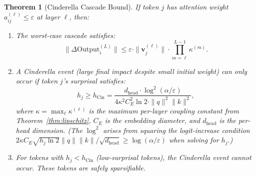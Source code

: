 \documentclass[11pt]{article}
\newtheorem{theorem}{Theorem}
\begin{document}
\begin{theorem}[Cinderella Cascade Bound]
\label{thm:cinderella}
If token $j$ has attention weight $a^{(\ell)}_{ij} \leq \varepsilon$ at layer
$\ell$, then:
\begin{enumerate}[leftmargin=2em,label=(\alph*)]
  \item The \emph{worst-case} cascade satisfies:
  \[
    \|\Delta \mathrm{Output}^{(L)}_i\|
    \leq \varepsilon \cdot \|\mathbf{v}^{(\ell)}_j\| \cdot \prod_{m=\ell}^{L-1}\kappa^{(m)}.
  \]
  \item A Cinderella event (large final impact despite small initial weight)
        can only occur if token $j$'s surprisal satisfies:
  \[
    h_j \geq h_{\mathrm{Cin}} =
    \frac{d_{\mathrm{head}} \cdot \log^2(\alpha/\varepsilon)}
    {4\kappa^2 C_E^2 \ln 2 \cdot \|q\|^2 \|k\|^2},
  \]
  where $\kappa = \max_\ell \kappa^{(\ell)}$ is the maximum per-layer coupling
  constant from Theorem~\ref{thm:lipschitz}, $C_E$ is the embedding diameter,
  and $d_{\mathrm{head}}$ is the per-head dimension.  (The $\log^2$ arises from
  squaring the logit-increase condition
  $2\kappa C_E\sqrt{h_j \ln 2}\|q\|\|k\|/\sqrt{d_{\mathrm{head}}} \geq
  \log(\alpha/\varepsilon)$ when solving for $h_j$.)
  \item For tokens with $h_j < h_{\mathrm{Cin}}$ (low-surprisal tokens),
        the Cinderella event cannot occur.  These tokens are safely sparsifiable.
\end{enumerate}
\end{theorem}
\end{document}
